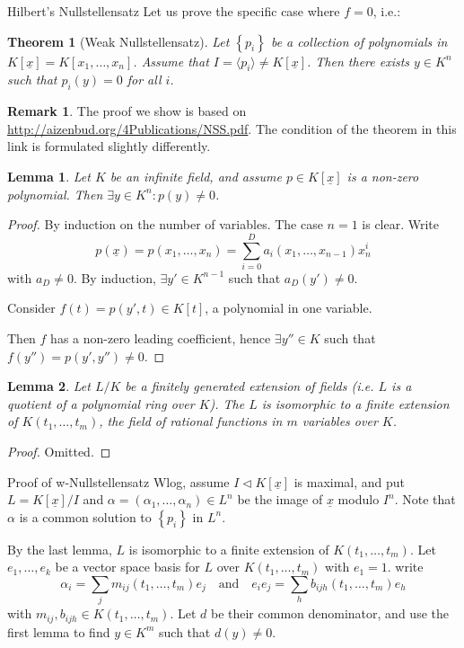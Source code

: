 \documentclass[12pt, draft,reqno,a4paper, twoside]{beamer}
\theoremstyle{plain}
\newtheorem{theo}{Theorem}
\newtheorem{lem}{Lemma}
\theoremstyle{definition}
\newtheorem{remark}{Remark}
\newcommand{\bmx}{\underline{x}}
\newcommand{\gen}[1]{\langle{#1}\rangle}
\newcommand{\set}[1]{\left\{{#1}\right\}}
\newcommand{\normal}{\triangleleft}
\begin{document}
\begin{frame}{Hilbert's Nullstellensatz}
Let us prove the specific case where $f=0$, i.e.:
\begin{theo}[Weak Nullstellensatz]
	Let $\set{p_i}$ be a collection of polynomials in $K[\bmx]=K[x_1,\ldots,x_n]$. Assume that $I=\gen{p_i}\neq K[\bmx]$. Then there exists $y\in K^n$ such that $p_i(y)=0$ for all $i$. 
\end{theo}
\begin{remark}
	The proof we show is based on \url{http://aizenbud.org/4Publications/NSS.pdf}. The condition of the theorem in this link is formulated slightly differently.
\end{remark}
\end{frame}

\begin{frame}
\begin{lem}
	Let $K$ be an infinite field, and assume $p\in K[\bmx]$ is a non-zero polynomial. Then $\exists y\in K^n: p(y)\ne 0$. 
\end{lem}
\begin{proof}
	By induction on the number of variables. The case $n=1$ is clear.
	\onslide<3-> Write \[p(\bmx)=p(x_1,\ldots,x_n)=\sum_{i=0}^D a_i(x_1,\ldots,x_{n-1})x_n^i\]
	with $a_D\ne 0$. \onslide<4-> By induction, $\exists y'\in K^{n-1}$ such that $a_D(y')\ne 0$. 
	
	 Consider $f(t)=p(y',t)\in K[t]$, a polynomial in one variable.
	
	 Then $f$ has a non-zero leading coefficient, hence $\exists y''\in K$ such that $f(y'')=p(y',y'')\ne 0$. 
\end{proof}
\end{frame}

\begin{frame}
	\begin{lem}
		Let $L/K$ be a finitely generated extension of fields (i.e. $L$ is a quotient of a polynomial ring over $K$). The $L$ is isomorphic to a finite extension of $K(t_1,\ldots,t_m)$, the field of rational functions in $m$ variables over $K$.
	\end{lem}
	\begin{proof}
		Omitted.
	\end{proof}
\end{frame}

\begin{frame}{Proof of w-Nullstellensatz}
	Wlog, assume $I\normal K[\bmx]$ is maximal, and put $L=K[\bmx]/I$ and $\alpha=(\alpha_1,\ldots,\alpha_n)\in L^n$ be the image of $\bmx$ modulo $I^n$. \onslide<2->  Note that $\alpha$ is a common solution to $\set{p_i}$ in $L^n$.
	
	\bigskip
	 By the last lemma, $L$ is isomorphic to a finite extension of $K(t_1,\ldots,t_m)$. Let $e_1,\ldots,e_k$ be a vector space basis for $L$ over $K(t_1,\ldots,t_m)$ with $e_1=1$. \onslide<3-> write
	\[\alpha_i=\sum_{j} m_{ij}(t_1,\ldots,t_m) e_j\quad \text{and}\quad e_ie_j=\sum_{h}b_{ijh}(t_1,\ldots,t_m)e_h\]
	with $m_{ij},b_{ijh}\in K(t_1,\ldots,t_m)$. \onslide<4-> Let $d$ be their common denominator, and use the first lemma to find $y\in K^m$ such that $d(y)\ne 0$. 
\end{frame}
\end{document}
